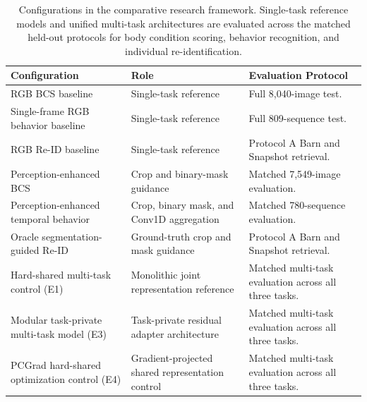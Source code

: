 \begin{table}[htbp]
\centering\small
\caption[Experimental model configurations]{Configurations in the comparative research framework. Single-task reference models and unified multi-task architectures are evaluated across the matched held-out protocols for body condition scoring, behavior recognition, and individual re-identification.}\label{tab:runstatus}
\begin{tabularx}{\textwidth}{YYY}
\toprule
Configuration & Role & Evaluation Protocol \\
\midrule
RGB BCS baseline & Single-task reference & Full 8,040-image test. \\
Single-frame RGB behavior baseline & Single-task reference & Full 809-sequence test. \\
RGB Re-ID baseline & Single-task reference & Protocol A Barn and Snapshot retrieval. \\
Perception-enhanced BCS & Crop and binary-mask guidance & Matched 7,549-image evaluation. \\
Perception-enhanced temporal behavior & Crop, binary mask, and Conv1D aggregation & Matched 780-sequence evaluation. \\
Oracle segmentation-guided Re-ID & Ground-truth crop and mask guidance & Protocol A Barn and Snapshot retrieval. \\
Hard-shared multi-task control (E1) & Monolithic joint representation reference & Matched multi-task evaluation across all three tasks. \\
Modular task-private multi-task model (E3) & Task-private residual adapter architecture & Matched multi-task evaluation across all three tasks. \\
PCGrad hard-shared optimization control (E4) & Gradient-projected shared representation control & Matched multi-task evaluation across all three tasks. \\
\bottomrule
\end{tabularx}
\end{table}
